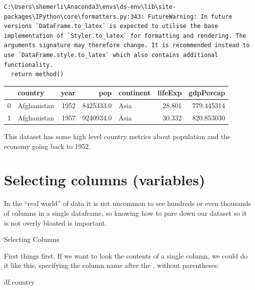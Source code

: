 \documentclass[
  letterpaper,
  DIV=11,
  numbers=noendperiod]{scrreprt}
\newenvironment{Shaded}{\begin{snugshade}}{\end{snugshade}}
\newcommand{\NormalTok}[1]{\textcolor[rgb]{0.00,0.23,0.31}{#1}}
\begin{document}
\begin{verbatim}
C:\Users\shemerli\Anaconda3\envs\ds-env\lib\site-packages\IPython\core\formatters.py:343: FutureWarning: In future versions `DataFrame.to_latex` is expected to utilise the base implementation of `Styler.to_latex` for formatting and rendering. The arguments signature may therefore change. It is recommended instead to use `DataFrame.style.to_latex` which also contains additional functionality.
  return method()
\end{verbatim}

\begin{tabular}{llrrlrr}
\toprule
{} &      country &  year &        pop & continent &  lifeExp &   gdpPercap \\
\midrule
0 &  Afghanistan &  1952 &  8425333.0 &      Asia &   28.801 &  779.445314 \\
1 &  Afghanistan &  1957 &  9240934.0 &      Asia &   30.332 &  820.853030 \\
\bottomrule
\end{tabular}

This dataset has some high level country metrics about population and
the economy going back to 1952.

\hypertarget{selecting-columns-variables}{%
\section{Selecting columns
(variables)}\label{selecting-columns-variables}}

In the ``real world'' of data it is not uncommon to see hundreds or even
thousands of columns in a single dataframe, so knowing how to pare down
our dataset so it is not overly bloated is important.

Selecting Columns

First things first. If we want to look the contents of a single column,
we could do it like this, specifying the column name after the . without
parentheses:

\begin{Shaded}
\begin{Highlighting}[]
\NormalTok{df.country}
\end{Highlighting}
\end{Shaded}
\end{document}
